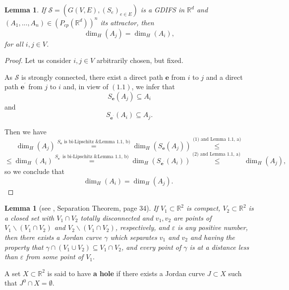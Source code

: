\documentclass[a4paper,12pt,reqno]{amsart}
\numberwithin{equation}{section}
\newtheorem{lemma}[theorem]{Lemma}
\theoremstyle{definition}
\theoremstyle{remark}
\numberwithin{equation}{section}
\begin{document}
\begin{lemma} \label{equaldiem}
    If $\mathcal{S}=(G(V,E),(S_{e})_{e\in E})$ is a GDIFS in $\mathbb{R}^{d}$ and $(A_{1},...,A_{n})\in (P_{cp}(
\mathbb{R}^{d}))^{n}$ its attractor, then
$$\dim _{H}(A_{j})=\dim _{H}(A_{i}),$$
for all $i,j\in V$.
\end{lemma}
\begin{proof}
     Let us consider $i,j\in V$ arbitrarily chosen, but fixed.

As $\mathcal{S}$ is strongly connected, there exist a direct path $\mathbf{e}
$ from $i$ to $j$ and a direct path $\mathbf{e}^{^{\prime }}$ from $j$ to $i$
and, in view of $(1.1)$, we infer that 
\begin{equation}
S_{\mathbf{e}}(A_{j})\subseteq A_{i}  \tag{1}
\end{equation}%
and%
\begin{equation}
S_{\mathbf{e}^{^{\prime }}}(A_{i})\subseteq A_{j}\text{.}  \tag{2}
\end{equation}

Then we have%
\[
\dim _{H}(A_{j})\overset{S_{\mathbf{e}}\text{ is bi-Lipschitz \& Lemma 1.1,
b)}}{=}\dim _{H}(S_{\mathbf{e}}(A_{j}))\overset{\text{(1) and Lemma 1.1, a)}}%
{\leq }
\]%
\[
\leq \dim _{H}(A_{i})\overset{S_{\mathbf{e}^{^{\prime }}}\text{ is
bi-Lipschitz \& Lemma 1.1, b)}}{=}\dim _{H}(S_{\mathbf{e}^{^{\prime
}}}(A_{i}))\overset{\text{(2) and Lemma 1.1, a) }}{\leq }\dim _{H}(A_{j})%
\text{,}
\]%
so we conclude that%
\[
\dim _{H}(A_{i})=\dim _{H}(A_{j})\text{. }
\]

\bigskip 

\end{proof}
\begin{lemma}[see \cite{GT}, Separation Theorem, page 34] \label{GTL}
    If $V_1 \subset \mathbb{R}^2$ is compact, $V_2 \subset \mathbb{R}^2$ is a closed set with $V_1 \cap V_2$ totally disconnected and $v_1, v_2$ are points of $V_1 \backslash (V_1 \cap V_2)$ and $V_2\backslash (V_1 \cap V_2)$, respectively, and $\varepsilon$ is any positive number, then there exists a Jordan curve $\gamma$ which separates $v_1$ and $v_2$ and having the property that $\gamma \cap (V_1 \cup V_2) \subseteq V_1 \cap V_2$, and every point of $\gamma$ is at a distance less than $\varepsilon$ from some point of $V_1.$
\end{lemma}

A set $X \subset \mathbb{R}^2$ is said to have \textbf{a hole} if there exists a Jordan curve $J \subset X$ such that $J^0 \cap X=\emptyset.$
\end{document}

